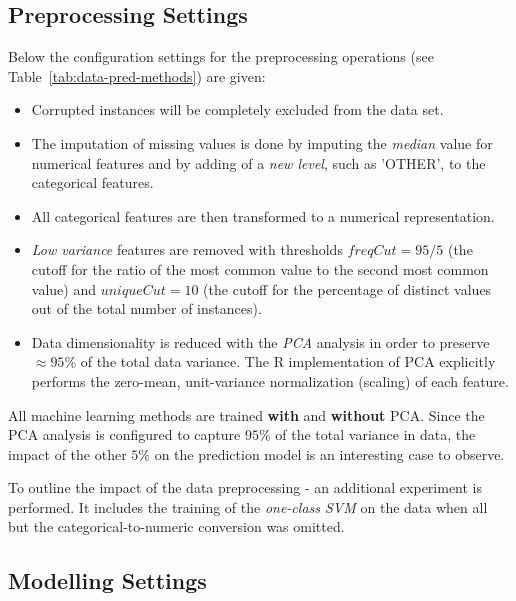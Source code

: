 \subsection{Preprocessing Settings}

Below the configuration settings for the preprocessing operations (see Table~\ref{tab:data-pred-methods}) are given:

\begin{itemize}
    \item Corrupted instances will be completely excluded from the data set.
    
    \item The imputation of missing values is done by imputing the \textit{median} value for numerical features and by adding of a \textit{new level}, such as 'OTHER', to the categorical features.
    
    \item All categorical features are then transformed to a numerical representation.
    
    \item \textit{Low variance} features are removed with thresholds \(freqCut = 95/5\) (the cutoff for the ratio of the most common value to the second most common value) and \(uniqueCut = 10\) (the cutoff for the percentage of distinct values out of the total number of instances). 
    
    \item Data dimensionality is reduced with the \textit{PCA} analysis in order to preserve \(\approx95\%\) of the total data variance. The R implementation of PCA explicitly performs the zero-mean, unit-variance normalization (scaling) of each feature.
    
\end{itemize}

All machine learning methods are trained \textbf{with} and \textbf{without} PCA. Since the PCA analysis is configured to capture \(95\%\) of the total variance in data, the impact of the other \(5\%\) on the prediction model is an interesting case to observe.

To outline the impact of the data preprocessing - an additional experiment is performed. It includes the training of the \textit{one-class SVM} on the data when all but the categorical-to-numeric conversion was omitted.

\subsection{Modelling Settings}

